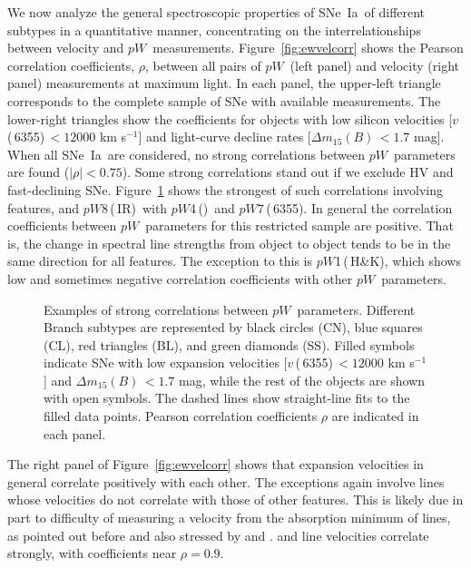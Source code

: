 \documentclass[apj]{emulateapj-rtx4}
\newcommand{\ew}{$pW$}
\newcommand{\pwone}{$pW$1\,(\ion{Ca}{2}\,H\&K)}
\newcommand{\pwfour}{$pW$4\,(\ion{Fe}{2})}
\newcommand{\pwseven}{$pW$7\,(\ion{Si}{2}\,6355)}
\newcommand{\pweight}{$pW$8\,(\ion{Ca}{2}\,IR)}
\newcommand{\vsix}{$v$\,(\ion{Si}{2}\,6355)}
\newcommand{\dm}{$\Delta m_{15}(B)$}
\newcommand{\sneia}{SNe~Ia}
\begin{document}
We now analyze the general spectroscopic properties of \sneia\ of
different subtypes in a quantitative manner, concentrating on the
interrelationships between velocity and
\ew\ measurements. Figure~\ref{fig:ewvelcorr} shows the Pearson correlation
coefficients, $\rho$, between all pairs of \ew\ (left panel) and velocity (right
panel) measurements at maximum light. In each panel, the upper-left
triangle corresponds to the complete sample of SNe with available
measurements. The lower-right triangles show the coefficients for
objects with low silicon velocities [\vsix\,$<12000$ km s$^{-1}$]
and light-curve decline rates [\dm\,$< 1.7$ mag]. When all \sneia\ are
considered, no strong correlations between 
\ew\ parameters are found ($|\rho|<0.75$). Some strong correlations
stand out if we exclude HV and fast-declining
SNe. Figure~\ref{fig:ewhicorr} shows the strongest of
such correlations involving  features, and \pweight\ with
\pwfour\ and \pwseven. In
general the correlation coefficients between \ew\ parameters for this
restricted sample are positive. That is, the change in spectral line 
strengths from object to object tends to be in the same direction for
all features. The exception to this is \pwone, which shows low and
sometimes negative correlation coefficients with other \ew\ parameters.

\begin{figure}[htpb]%
\caption{Examples of strong correlations between
  \ew\ parameters. Different Branch subtypes are
  represented by black circles (CN), blue squares (CL), red triangles
  (BL), and green diamonds (SS). Filled symbols indicate SNe with low expansion
  velocities [\vsix\,$<12000$ km s$^{-1}$] and \dm\,$<1.7$ mag, while
  the rest of the objects are shown with open symbols. The dashed
  lines show straight-line fits to the filled data points. Pearson
  correlation coefficients $\rho$ are indicated in each
  panel.\label{fig:ewhicorr}}  
\end{figure}

The right panel of Figure~\ref{fig:ewvelcorr} shows that expansion
velocities in general correlate positively with each other. The exceptions again
involve  lines whose velocities do not correlate with those
of other features. This is likely due in part to difficulty of
measuring a velocity from the absorption minimum of  lines,
as pointed out before and also stressed by \citet{foley11b} and
\citet{blondin12}.  and  line velocities
correlate strongly, with coefficients near $\rho=0.9$. 
\end{document}
